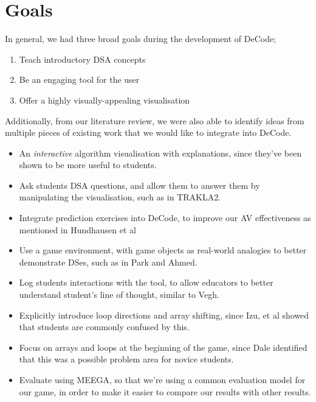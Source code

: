 \documentclass[10pt]{article}
\begin{document}
\section{Goals}
In general, we had three broad goals during the development of DeCode;
\begin{enumerate}
  \item Teach introductory DSA concepts
  \item Be an engaging tool for the user
  \item Offer a highly visually-appealing visualisation
\end{enumerate}
Additionally, from our literature review, we were also able to identify ideas from multiple pieces of existing work that we would like to integrate into DeCode.
\begin{itemize}
  \item An \emph{interactive} algorithm visualisation with explanations, since they've been shown to be more useful to students\cite{vegh2}.
  \item Ask students DSA questions, and allow them to answer them by manipulating the visualisation, such as in TRAKLA2\cite{TRAKLA2}.
  \item Integrate prediction exercises into DeCode, to improve our AV effectiveness as mentioned in Hundhausen et al\cite{metaStudy}
  \item Use a game environment, with game objects as real-world analogies to better demonstrate DSes, such as in Park and Ahmed\cite{Park}.
  \item Log students interactions with the tool, to allow educators to better understand student's line of thought, similar to Vegh\cite{vegh}.
  \item Explicitly introduce loop directions and array shifting, since Izu, et al\cite{izuloop} showed that students are commonly confused by this.
  \item Focus on arrays and loops at the beginning of the game, since Dale\cite{Dale:2006:MDT:1138403.1138432} identified that this was a possible problem area for novice students.
  \item Evaluate using MEEGA\cite{meegaPlus}, so that we're using a common evaluation model for our game, in order to make it easier to compare our results with other results.
\end{itemize}
\end{document}

